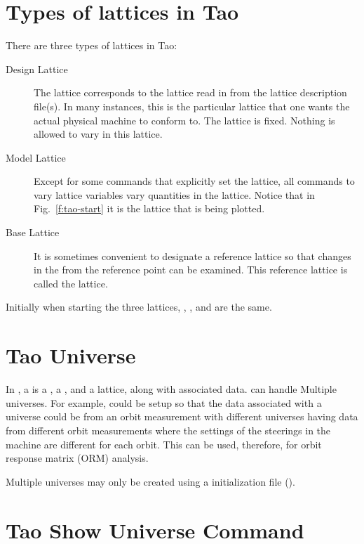 \documentclass{hitec}
\begin{document}
\section{Types of lattices in Tao}

There are three types of lattices in Tao:
  \begin{description}
  \item[Design Lattice] \Newline 
The  lattice corresponds to the lattice read in from the lattice description
file(s). In many instances, this is the particular lattice that one wants the actual
physical machine to conform to. The  lattice is fixed. Nothing is allowed to
vary in this lattice.
  \item[Model Lattice] \Newline
Except for some commands that explicitly set the  lattice, all \tao commands to
vary lattice variables vary quantities in the  lattice. Notice that in
Fig.~\ref{f:tao-start} it is the  lattice that is being plotted.
  \item[Base Lattice] \Newline
It is sometimes convenient to designate a reference lattice so that changes in the
 from the reference point can be examined.  This reference lattice is called the
 lattice.
  \end{description}
Initially when starting \tao the three lattices, , , and 
are the same.

\section{Tao Universe}

In \tao, a  is a , a , and a  lattice, along
with associated data. \tao can handle Multiple universes. For example, \tao could be setup
so that the data associated with a universe could be from an orbit measurement with
different universes having data from different orbit measurements where the settings of
the steerings in the machine are different for each orbit. This can be used, therefore,
for orbit response matrix (ORM) analysis.

Multiple universes may only be created using a \tao initialization file ().

\section{Tao Show Universe Command}
\end{document}

